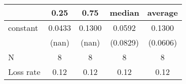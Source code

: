 \begin{tabular}{lcccc}
\hline
          &  0.25  &  0.75  &  median  & average   \\
\midrule
\midrule
constant  & 0.0433 & 0.1300 & 0.0592   & 0.1300    \\
          & (nan)  & (nan)  & (0.0829) & (0.0606)  \\
N         & 8      & 8      & 8        & 8         \\
Loss rate & 0.12   & 0.12   & 0.12     & 0.12      \\
\hline
\end{tabular}